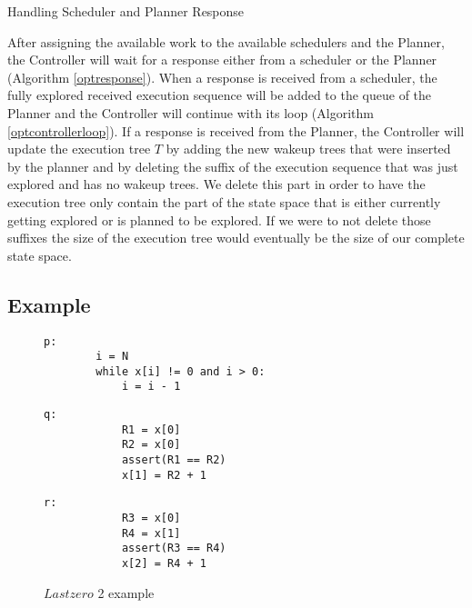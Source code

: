 \begin{algorithm}
    \caption{Handling Scheduler and Planner Response}
    \label{optresponse}
\end{algorithm}

After assigning the available work to the available schedulers and the Planner, the Controller will wait for a response
either from a scheduler or the Planner (Algorithm \ref{optresponse}). When a response is received from a scheduler,
the fully explored received execution sequence will be added to the queue of the Planner and the Controller will continue
with its loop (Algorithm \ref{optcontrollerloop}). If a response is received from the Planner, the Controller will update
the execution tree $T$ by adding the new wakeup trees that were inserted by the planner and by deleting the suffix of
the execution sequence that was just explored and has no wakeup trees. We delete this part in order to have the 
execution tree only contain the part of the state space that is either currently getting explored or is planned to be explored.
If we were to not delete those suffixes the size of the execution tree would eventually be the size of our complete state space.

\subsection{Example}

\begin{figure*}
    \begin{minipage}{0.3\textwidth}
      \begin{lstlisting}[frame=none, numbers=none]
        p:
        i = N
        while x[i] != 0 and i > 0:
            i = i - 1
      \end{lstlisting}
    \end{minipage}
    \begin{minipage}{0.3\textwidth}
        \begin{lstlisting}[frame=none, numbers=none]
            q:
            R1 = x[0]
            R2 = x[0]
            assert(R1 == R2)
            x[1] = R2 + 1
        \end{lstlisting}
      \end{minipage}
      \begin{minipage}{0.3\textwidth}
        \begin{lstlisting}[frame=none, numbers=none]
            r:
            R3 = x[0]
            R4 = x[1]
            assert(R3 == R4)
            x[2] = R4 + 1
        \end{lstlisting}
      \end{minipage}
      \caption{$Lastzero$ 2 example}
      \label{optexample}
  \end{figure*}

